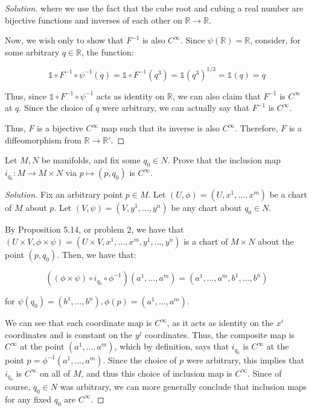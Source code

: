 \documentclass[10pt]{article}
\newenvironment{problem}[2][]{\begin{trivlist}
\item[\hskip \labelsep {\bfseries #1}\hskip \labelsep {\bfseries #2.}]}{\end{trivlist}}
\begin{document}
\begin{proof}[Solution]
where we use the fact that the cube root and cubing a real number are bijective functions and inverses of each other on $\mathbb{R} \to \mathbb{R}$.

Now, we wish only to show that $F^{-1}$ is also $C^\infty$. Since $\psi(\mathbb{R}) = \mathbb{R}$, consider, for some arbitrary $q \in \mathbb{R}$, the function:

$$\mathds{1} \circ F^{-1} \circ \psi^{-1} (q) =  \mathds{1} \circ F^{-1} (q^3) = \mathds{1} (q^3)^{1/3} = \mathds{1} (q) = q$$

Thus, since $\mathds{1} \circ F^{-1} \circ \psi^{-1}$ acts as identity on $\mathbb{R}$, we can also claim that $F^{-1}$ is $C^\infty$ at $q$. Since the choice of $q$ were arbitrary, we can actually say that $F^{-1}$ is $C^\infty$.

Thus, $F$ is a bijective $C^\infty$ map such that its inverse is also $C^\infty$. Therefore, $F$ is a diffeomorphism from $\mathbb{R} \to \mathbb{R}'$. 




\end{proof}

\begin{problem}{Question 4}

Let $M, N$ be manifolds, and fix some $q_0 \in N$. Prove that the inclusion map $i_{q_0}: M \to M \times N$ via $p \mapsto (p,q_0)$ is $C^\infty$.

\end{problem}

\begin{proof}[Solution]

Fix an arbitrary point $p \in M$.  Let $(U, \phi) = (U, x^1,...,x^m)$ be a chart of $M$ about $p$. Let $(V, \psi) = (V, y^1,...,y^n)$ be any chart about $q_0 \in N$. 

By Proposition 5.14, or problem 2, we have that $(U \times V, \phi \times \psi) = (U \times V, x^1,...,x^m, y^1,...,y^n)$ is a chart of $M \times N$ about the point $(p, q_0)$. Then, we have that:

$$ ((\phi \times \psi) \circ i_{q_0} \circ \phi^{-1})(a^1,...,a^m)  = (a^1,...,a^m,b^1,...,b^n)$$

for $\psi(q_0) = (b^1,...,b^n), \phi(p) = (a^1,...,a^m)$.

We can see that each coordinate map is $C^\infty$, as it acts as identity on the $x^i$ coordinates and is constant on the $y^j$ coordinates. Thus, the composite map is $C^\infty$ at the point $(a^1,...,a^m)$, which by definition, says that $i_{q_0}$ is $C^\infty$ at the point $p = \phi^{-1}(a^1,...,a^m)$. Since the choice of $p$ were arbitrary, this implies that $i_{q_0}$ is $C^\infty$ on all of $M$, and thus this choice of inclusion map is $C^\infty$. Since of course, $q_0 \in N$ was arbitrary, we can more generally conclude that inclusion maps for any fixed $q_0$ are $C^\infty$.

\end{proof}
\end{document}
